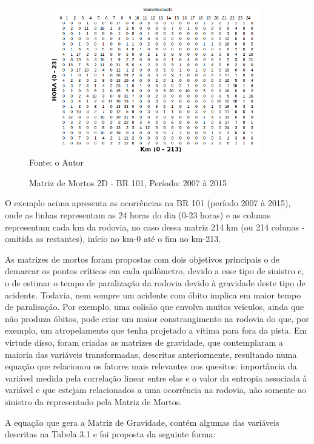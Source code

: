 \pagebreak

\begin{figure}[!ht]
\centering
\caption{Matriz de Mortos 2D - BR 101, Período: 2007 à 2015}
\label{fig:MatrizMortos2D}
\includegraphics[width=110mm, height=65mm]{Figuras/Metodologia/MatrizMortos2D}\\
\tiny Fonte: o Autor
\end{figure}

O exemplo acima apresenta as ocorrências na BR 101 (período 2007 à 2015), onde as linhas representam as 24 horas do dia (0-23 horas) e as colunas representam cada km da rodovia, no caso dessa matriz 214 km (ou 214 colunas - omitida as restantes), início no km-0 até o fim no km-213.



As matrizes de mortos foram propostas com dois objetivos principais o de demarcar os pontos  críticos em cada quilômetro, devido a esse tipo de sinistro e, o de estimar o tempo de paralização da rodovia devido à gravidade deste tipo de acidente. Todavia, nem sempre um acidente com óbito implica em maior tempo de paralisação. Por exemplo, uma colisão que envolva muitos veículos, ainda que não produza óbitos, pode criar um maior constrangimento na rodovia do que, por exemplo, um atropelamento que tenha projetado a vítima para fora da pista. Em virtude disso, foram criadas as matrizes de gravidade, que contemplaram a maioria das variáveis transformadas, descritas anteriormente, resultando numa equação que relacionou os fatores mais relevantes nos quesitos: importância da variável medida pela correlação linear entre elas e o valor da entropia associada à variável e que estejam relacionados a uma ocorrência na rodovia, não somente ao sinistro da representado pela Matriz de Mortos. 

\vspace{5mm}

A equação que gera a Matriz de Gravidade, contém algumas das variáveis descritas na Tabela 3.1 e foi proposta da seguinte forma: 

